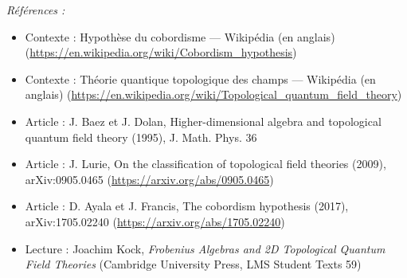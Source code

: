 \documentclass[11pt]{article}
\newenvironment{refs}{\par\small\noindent\emph{Références :}\begin{itemize}\setlength\itemsep{0pt}}{\end{itemize}\normalsize}
\begin{document}
\begin{refs}
\item Contexte : Hypothèse du cobordisme --- Wikipédia (en anglais) (\url{https://en.wikipedia.org/wiki/Cobordism_hypothesis})
\item Contexte : Théorie quantique topologique des champs --- Wikipédia (en anglais) (\url{https://en.wikipedia.org/wiki/Topological_quantum_field_theory})
\item Article : J. Baez et J. Dolan, \og{} Higher-dimensional algebra and topological quantum field theory \fg{} (1995), J. Math. Phys. 36
\item Article : J. Lurie, \og{} On the classification of topological field theories \fg{} (2009), arXiv:0905.0465 (\url{https://arxiv.org/abs/0905.0465})
\item Article : D. Ayala et J. Francis, \og{} The cobordism hypothesis \fg{} (2017), arXiv:1705.02240 (\url{https://arxiv.org/abs/1705.02240})
\item Lecture : Joachim Kock, \textit{Frobenius Algebras and 2D Topological Quantum Field Theories} (Cambridge University Press, LMS Student Texts 59)
\end{refs}

\bigskip
\end{document}
